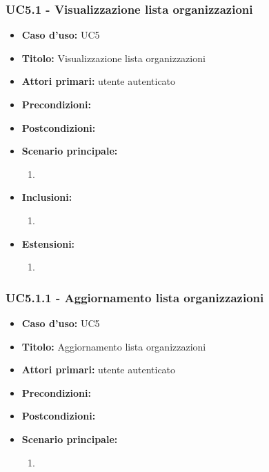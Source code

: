 \documentclass[casi-duso]{subfiles}
\begin{document}
\subsubsection{UC5.1 - Visualizzazione lista organizzazioni}
\label{subsub:uc5utente}
\begin{itemize}
  \item \textbf{Caso d’uso:} UC5 
  \item \textbf{Titolo:} Visualizzazione lista organizzazioni
  \item \textbf{Attori primari:} utente autenticato
  \item \textbf{Precondizioni:} 
  \item \textbf{Postcondizioni:}
  \item \textbf{Scenario principale:} 
  \begin{enumerate}
    \item 
  \end{enumerate}  
  \item \textbf{Inclusioni:} 
  \begin{enumerate}
    \item 
  \end{enumerate}
  \item \textbf{Estensioni:} 
  \begin{enumerate}
    \item 
  \end{enumerate}  
\end{itemize}

\subsubsection{UC5.1.1 - Aggiornamento lista organizzazioni}
\label{subsub:uc5utente}
\begin{itemize}
  \item \textbf{Caso d’uso:} UC5 
  \item \textbf{Titolo:} Aggiornamento lista organizzazioni
  \item \textbf{Attori primari:} utente autenticato
  \item \textbf{Precondizioni:} 
  \item \textbf{Postcondizioni:}
  \item \textbf{Scenario principale:} 
  \begin{enumerate}
    \item 
  \end{enumerate}  
\end{itemize}
\end{document}
